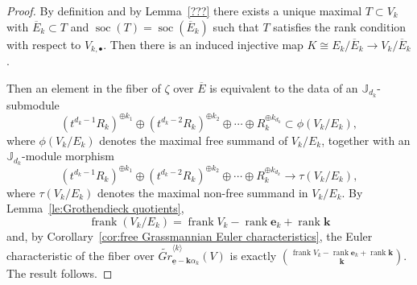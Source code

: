\documentclass{amsart}
\numberwithin{equation}{section}
\theoremstyle{definition}
\def\JJ{\mathbb{J}}
\def\bfe{\mathbf{e}}
\def\ubfe{{\underline{\mathbf{e}}}}
\def\bfk{\mathbf{k}}
\def\frank{\operatorname{frank}}
\def\rank{\operatorname{rank}}
\def\soc{\operatorname{soc}}
\begin{document}
\begin{proof}
  By definition and by Lemma~\ref{???} there exists a unique maximal $T\subset V_k$ with $\overline{E}_k\subset T$ and $\soc(T)=\soc(\overline{E}_k)$ such that $T$ satisfies the rank condition with respect to $V_{k,\bullet}$.  
  Then there is an induced injective map $K\cong E_k/\overline{E}_k\to V_k/\overline{E}_k$.  


  Then an element in the fiber of $\zeta$ over $\overline{E}$ is equivalent to the data of an $\JJ_{d_k}$-submodule 
  \[(t^{d_k-1}R_k)^{\oplus k_1}\oplus(t^{d_k-2}R_k)^{\oplus k_2}\oplus\cdots\oplus R_k^{\oplus k_{d_k}}\subset\phi(V_k/E_k),\] 
  where $\phi(V_k/E_k)$ denotes the maximal free summand of $V_k/E_k$, together with an $\JJ_{d_k}$-module morphism 
  \[(t^{d_k-1}R_k)^{\oplus k_1}\oplus(t^{d_k-2}R_k)^{\oplus k_2}\oplus\cdots\oplus R_k^{\oplus k_{d_k}}\to\tau(V_k/E_k),\] 
  where $\tau(V_k/E_k)$ denotes the maximal non-free summand in $V_k/E_k$.  By Lemma~\ref{le:Grothendieck quotients}, 
  \[\frank(V_k/E_k)=\frank V_k-\rank\bfe_k+\rank\bfk\] 
  and, by Corollary~\ref{cor:free Grassmannian Euler characteristics}, the Euler characteristic of the fiber over $\widetilde{Gr}_{\ubfe-\bfk\alpha_k}^{\langle k\rangle}(V)$ is exactly ${\frank V_k-\rank\bfe_k+\rank\bfk\choose\bfk}$.  The result follows.
\end{proof}
\end{document}
